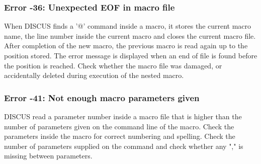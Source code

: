 \subsubsection{Error -36: Unexpected EOF in macro file}
\par
When DISCUS finds a '@' command inside a macro, it stores the current 
macro name, the line number inside the current macro and closes the 
current macro file. After completion of the new macro, the previous 
macro is read again up to the position stored. The error message 
is displayed when an end of file is found before the position is 
reached. Check whether the macro file was damaged, or accidentally 
deleted during execution of the nested macro. 
\subsubsection{Error -41: Not enough macro parameters given}
\par
DISCUS read a parameter number inside a macro file that is higher 
than the number of parameters given on the command line of the macro. 
Check the parameters inside the macro for correct numbering and 
spelling. Check the number of parameters supplied on the command and 
check whether any "," is missing between parameters. 
